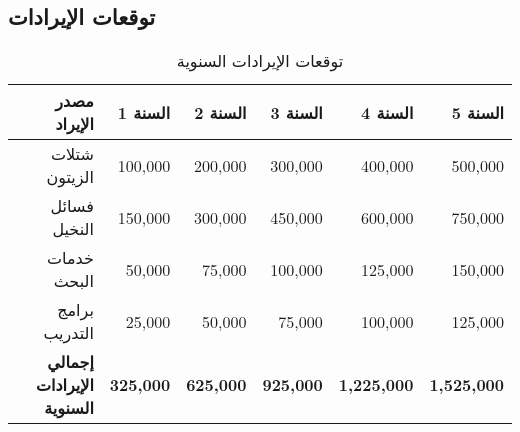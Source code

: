 \subsection{توقعات الإيرادات}

\begin{table}[h]
\centering
\begin{tabular}{|r|r|r|r|r|r|}
\hline
\textbf{مصدر الإيراد} & \textbf{السنة 1} & \textbf{السنة 2} & \textbf{السنة 3} & \textbf{السنة 4} & \textbf{السنة 5} \\
\hline
شتلات الزيتون & 100,000 & 200,000 & 300,000 & 400,000 & 500,000 \\
فسائل النخيل & 150,000 & 300,000 & 450,000 & 600,000 & 750,000 \\
خدمات البحث & 50,000 & 75,000 & 100,000 & 125,000 & 150,000 \\
برامج التدريب & 25,000 & 50,000 & 75,000 & 100,000 & 125,000 \\
\hline
\textbf{إجمالي الإيرادات السنوية} & \textbf{325,000} & \textbf{625,000} & \textbf{925,000} & \textbf{1,225,000} & \textbf{1,525,000} \\
\hline
\end{tabular}
\caption{توقعات الإيرادات السنوية}
\end{table}

